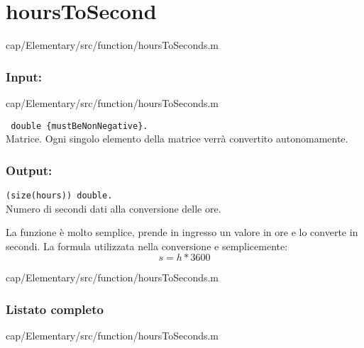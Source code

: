 \section{hoursToSecond}\label{fnc:hoursToSecond}


{cap/Elementary/src/function/hoursToSeconds.m}%

\subsubsection{Input:}

{cap/Elementary/src/function/hoursToSeconds.m}%

\begin{tcolorbox}
    \begin{description} 
\setlength{\itemindent}{-.2in}%
    \item[\textit{hours:}] \verb| double {mustBeNonNegative}.|\\
    Matrice. Ogni singolo elemento della matrice verrà convertito 
    autonomamente.
\end{description}
\end{tcolorbox}

\subsubsection{Output:}
\begin{tcolorbox}
\begin{description}
\setlength{\itemindent}{-.2in}
    \item[\textit{seconds:}] \verb|(size(hours)) double.|\\
     Numero di secondi dati alla conversione delle ore.
\end{description}
\end{tcolorbox}

La funzione è molto semplice, prende in ingresso un valore in ore e lo 
converte in secondi. La formula utilizzata nella conversione e semplicemente: 
$$s=h*3600$$

{cap/Elementary/src/function/hoursToSeconds.m}%

\begin{changelog}[author=Cristina, simple, title={Modifiche alla funzione}, 
    label=chgf:hoursToSecond, sectioncmd=\subsubsection*]
    
     
     
\end{changelog}
\newpage
\subsubsection{Listato completo}

{cap/Elementary/src/function/hoursToSeconds.m}%